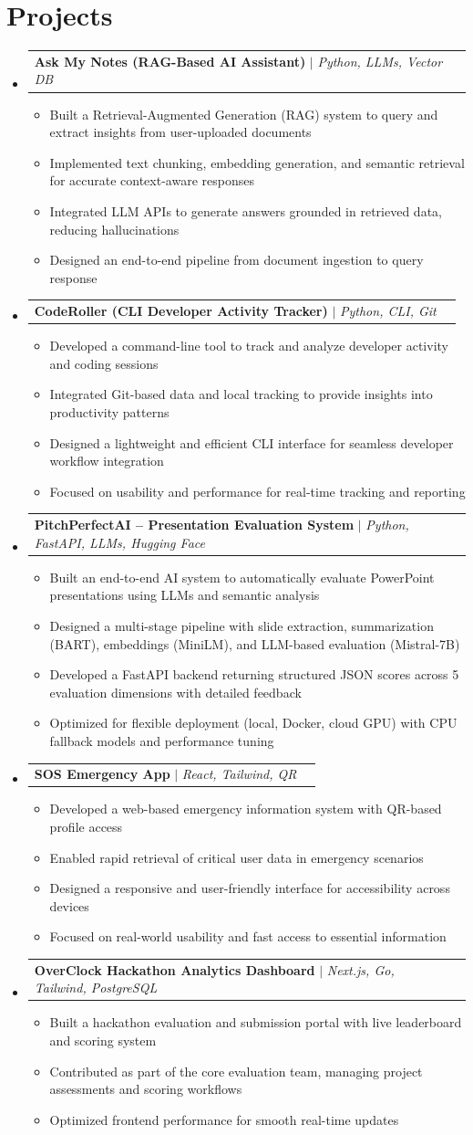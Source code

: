 \documentclass[letterpaper,11pt]{article}
\makeatletter
\newcommand{\resumeItem}[1]{
  \item\small{
    {#1 \vspace{-2pt}}
  }
}
\newcommand{\resumeProjectHeading}[2]{
    \item
    \begin{tabular*}{0.97\textwidth}{l@{\extracolsep{\fill}}r}
      \small#1 & #2 \\
    \end{tabular*}\vspace{-7pt}
}
\newcommand{\resumeSubHeadingListStart}{\begin{itemize}[leftmargin=0.15in, label={}]}
\newcommand{\resumeSubHeadingListEnd}{\end{itemize}}
\newcommand{\resumeItemListStart}{\begin{itemize}}
\newcommand{\resumeItemListEnd}{\end{itemize}\vspace{-5pt}}
\makeatother
\begin{document}
\section{Projects}
   \resumeSubHeadingListStart
  \resumeProjectHeading
  {\textbf{Ask My Notes (RAG-Based AI Assistant)} $|$ \emph{Python, LLMs, Vector DB}}{}
  \resumeItemListStart
    \resumeItem{Built a Retrieval-Augmented Generation (RAG) system to query and extract insights from user-uploaded documents}
    \resumeItem{Implemented text chunking, embedding generation, and semantic retrieval for accurate context-aware responses}
    \resumeItem{Integrated LLM APIs to generate answers grounded in retrieved data, reducing hallucinations}
    \resumeItem{Designed an end-to-end pipeline from document ingestion to query response}
  \resumeItemListEnd
  \resumeProjectHeading
  {\textbf{CodeRoller (CLI Developer Activity Tracker)} $|$ \emph{Python, CLI, Git}}{}
  \resumeItemListStart
    \resumeItem{Developed a command-line tool to track and analyze developer activity and coding sessions}
    \resumeItem{Integrated Git-based data and local tracking to provide insights into productivity patterns}
    \resumeItem{Designed a lightweight and efficient CLI interface for seamless developer workflow integration}
    \resumeItem{Focused on usability and performance for real-time tracking and reporting}
  \resumeItemListEnd
  \resumeProjectHeading
  {\textbf{PitchPerfectAI – Presentation Evaluation System} $|$ \emph{Python, FastAPI, LLMs, Hugging Face}}{}
  \resumeItemListStart
    \resumeItem{Built an end-to-end AI system to automatically evaluate PowerPoint presentations using LLMs and semantic analysis}
    \resumeItem{Designed a multi-stage pipeline with slide extraction, summarization (BART), embeddings (MiniLM), and LLM-based evaluation (Mistral-7B)}
    \resumeItem{Developed a FastAPI backend returning structured JSON scores across 5 evaluation dimensions with detailed feedback}
    \resumeItem{Optimized for flexible deployment (local, Docker, cloud GPU) with CPU fallback models and performance tuning}
  \resumeItemListEnd
  \resumeProjectHeading
  {\textbf{SOS Emergency App} $|$ \emph{React, Tailwind, QR}}{}
  \resumeItemListStart
    \resumeItem{Developed a web-based emergency information system with QR-based profile access}
    \resumeItem{Enabled rapid retrieval of critical user data in emergency scenarios}
    \resumeItem{Designed a responsive and user-friendly interface for accessibility across devices}
    \resumeItem{Focused on real-world usability and fast access to essential information}
  \resumeItemListEnd
 \resumeProjectHeading
  {\textbf{OverClock Hackathon Analytics Dashboard} $|$ \emph{Next.js, Go, Tailwind, PostgreSQL}}{}
  \resumeItemListStart
    \resumeItem{Built a hackathon evaluation and submission portal with live leaderboard and scoring system}
    \resumeItem{Contributed as part of the core evaluation team, managing project assessments and scoring workflows}
    \resumeItem{Optimized frontend performance for smooth real-time updates}
  \resumeItemListEnd
\resumeSubHeadingListEnd
\end{document}
